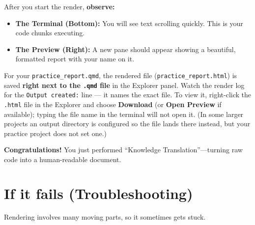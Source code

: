 \documentclass[
  letterpaper,
  DIV=11,
  numbers=noendperiod,
  oneside]{scrreprt}
\providecommand{\tightlist}{%
  \setlength{\itemsep}{0pt}\setlength{\parskip}{0pt}}
\begin{document}
After you start the render, \textbf{observe:}

\begin{itemize}
\tightlist
\item
  \textbf{The Terminal (Bottom):} You will see text scrolling quickly.
  This is your code chunks executing.
\item
  \textbf{The Preview (Right):} A new pane should appear showing a
  beautiful, formatted report with your name on it.
\end{itemize}

\begin{tcolorbox}[enhanced jigsaw, title=\textcolor{quarto-callout-note-color}{\faInfo}\hspace{0.5em}{Where is my HTML file?}, arc=.35mm, toptitle=1mm, colframe=quarto-callout-note-color-frame, toprule=.15mm, leftrule=.75mm, bottomtitle=1mm, opacityback=0, bottomrule=.15mm, coltitle=black, breakable, opacitybacktitle=0.6, titlerule=0mm, colback=white, left=2mm, colbacktitle=quarto-callout-note-color!10!white, rightrule=.15mm]

For your \texttt{practice\_report.qmd}, the rendered file
(\texttt{practice\_report.html}) is saved \textbf{right next to the
\texttt{.qmd} file} in the Explorer panel. Watch the render log for the
\texttt{Output\ created:} line --- it names the exact file. To view it,
right-click the \texttt{.html} file in the Explorer and choose
\textbf{Download} (or \textbf{Open Preview} if available); typing the
file name in the terminal will not open it. (In some larger projects an
output directory is configured so the file lands there instead, but your
practice project does not set one.)

\end{tcolorbox}

\textbf{Congratulations!} You just performed ``Knowledge
Translation''---turning raw code into a human-readable document.

\section{If it fails
(Troubleshooting)}\label{if-it-fails-troubleshooting}

Rendering involves many moving parts, so it sometimes gets stuck.
\end{document}
